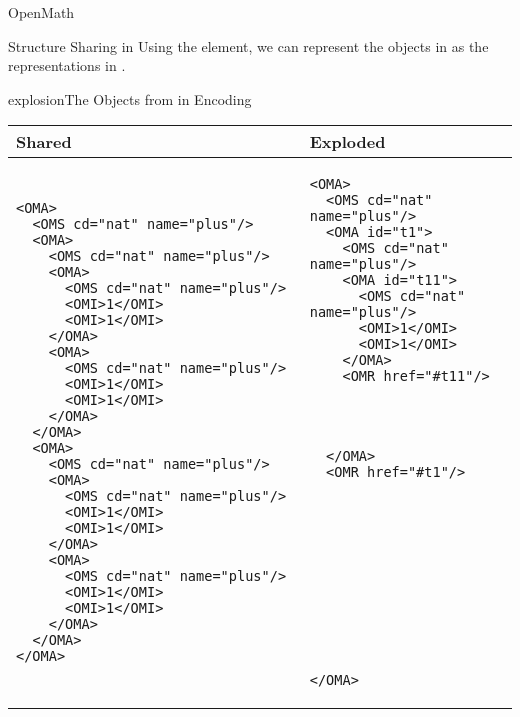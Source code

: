 \begin{omgroup}[id=mobj,short=Mathematical Objects]
\begin{omgroup}[id=openmath]{OpenMath}
\begin{module}[id=OpenMath]
\begin{omgroup}[id=om.structure-sharing]{Structure Sharing in {\openmath}}
Using the  element, we can represent the {\openmath} objects in
{} as the {\xml} representations in {}.

\begin{myfig}{explosion}{The {\openmath} Objects from {} in {\xml} Encoding}
\begin{tabular}{|p{5.2cm}|p{5.2cm}|}\hline
Shared & Exploded \\\hline\hline
\begin{lstlisting}
<OMA>                        
  <OMS cd="nat" name="plus"/>               
  <OMA>                      
    <OMS cd="nat" name="plus"/>             
    <OMA>                    
      <OMS cd="nat" name="plus"/>           
      <OMI>1</OMI>
      <OMI>1</OMI>
    </OMA>                    
    <OMA>                     
      <OMS cd="nat" name="plus"/>
      <OMI>1</OMI>
      <OMI>1</OMI>
    </OMA>
  </OMA>                      
  <OMA>                       
    <OMS cd="nat" name="plus"/>
    <OMA>                                           
      <OMS cd="nat" name="plus"/>
      <OMI>1</OMI>
      <OMI>1</OMI>
    </OMA>   
    <OMA>
      <OMS cd="nat" name="plus"/>
      <OMI>1</OMI>
      <OMI>1</OMI>
    </OMA>
  </OMA>                      
</OMA>                        
\end{lstlisting}
& 
\begin{lstlisting}
<OMA>
  <OMS cd="nat" name="plus"/>
  <OMA id="t1">
    <OMS cd="nat" name="plus"/>
    <OMA id="t11">
      <OMS cd="nat" name="plus"/>
      <OMI>1</OMI>
      <OMI>1</OMI>
    </OMA>
    <OMR href="#t11"/>




  </OMA>
  <OMR href="#t1"/>












</OMA>
\end{lstlisting}
\\\hline
\end{tabular}
\end{myfig}


\end{omgroup}
\end{module}
\end{omgroup}
\end{omgroup}
